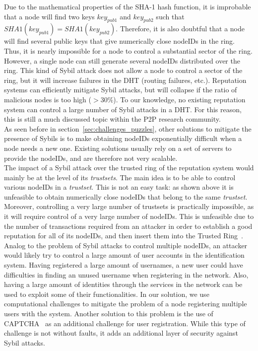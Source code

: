 Due to the mathematical properties of the SHA-1 hash function, it is
improbable that a node will find two keys $key_{pub1}$ and
$key_{pub2}$ such that $SHA1(key_{pub1}) = SHA1(key_{pub2})$. Therefore, it is
also doubtful that a node will find several public keys that give
numerically close nodeIDs in the ring. Thus, it is nearly impossible for a
node to control a substantial sector of the ring.\\

However, a single node can still generate several nodeIDs distributed over the
ring. This kind of Sybil attack does not allow a node to control a sector of the ring,
but it will increase failures in the DHT (routing failures, etc.).  Reputation
systems can efficiently mitigate Sybil attacks, but will collapse if the
ratio of malicious nodes is too high ($> 30\%$). To our knowledge, no existing reputation system can control a large
number of Sybil attacks in a DHT. For this reason, this is still a much
discussed topic within
the P2P research community.\\

As seen before in section~\ref{sec:challenges_puzzles}, other solutions to
mitigate the presence of Sybils is to make obtaining nodeIDs
exponentially difficult when a node needs a new
one. Existing solutions usually
rely on a set of servers to provide the nodeIDs, and are therefore not very
scalable.\\

The impact of a Sybil attack over the trusted ring of the reputation system
would mainly be at the level of its \textit{trustsets}. The main idea is to be
able to control various nodeIDs in a \textit{trustset}. This is not an easy
task: as shown above it is unfeasible to obtain numerically close
nodeIDs that belong to the same \textit{trustset}. Moreover, controlling a very
large number of trustsets is practically impossible, as it will require 
control of a very large number of nodeIDs. This is unfeasible due to the number of
transactions required from an attacker in order to establish a good reputation
for all of its nodeIDs, and then insert them into the Trusted
Ring~\cite{rosas2011corps}.\\

Analog to the problem of Sybil attacks to control multiple nodeIDs, an attacker
would likely try to control a large amount of user accounts in the
identification system. Having registered a large amount of usernames, a new
user could have difficulties in finding an unused username when registering in the
network. Also, having a large amount of identities through the services in the
network can be used to exploit some of their functionalities.
In our solution, we use computational challenges to mitigate the problem of a
node registering multiple users with the system. Another solution to
this problem is the use of CAPTCHA~\cite{von2003captcha} as an additional
challenge for user registration. While this type of challenge is not
without faults, it adds an additional layer of security against Sybil attacks.


